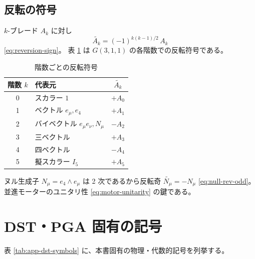 \documentclass[dvipdfmx,a4paper,oneside]{jsbook}
\numberwithin{equation}{chapter}
\begin{document}
\subsection{反転の符号}

\(k\)-ブレード \(A_k\) に対し
\begin{equation}
  \widetilde{A_k} = (-1)^{k(k-1)/2}\, A_k
  \label{eq:app-reversion}
\end{equation}
\eqref{eq:reversion-sign}。
表 \ref{tab:app-reversion} は \(G(3,1,1)\) の各階数での反転符号である。

\begin{table}[htbp]
  \centering
  \caption{階数ごとの反転符号}
  \label{tab:app-reversion}
  \begin{tabular}{@{}clc@{}}
    \toprule
    階数 \(k\) & 代表元 & \(\widetilde{A_k}\) \\
    \midrule
    0 & スカラー \(1\) & \(+A_0\) \\
    1 & ベクトル \(e_\mu, e_4\) & \(+A_1\) \\
    2 & バイベクトル \(e_\mu e_\nu, N_\mu\) & \(-A_2\) \\
    3 & 三ベクトル & \(+A_3\) \\
    4 & 四ベクトル & \(-A_4\) \\
    5 & 擬スカラー \(I_5\) & \(+A_5\) \\
    \bottomrule
  \end{tabular}
\end{table}

ヌル生成子 \(N_\mu = e_4 \wedge e_\mu\) は 2 次であるから反転奇 \(\widetilde{N_\mu} = -N_\mu\) \eqref{eq:null-rev-odd}。並進モーターのユニタリ性 \eqref{eq:motor-unitarity} の鍵である。

\section{DST・PGA 固有の記号}

表 \ref{tab:app-dst-symbols} に、本書固有の物理・代数的記号を列挙する。
\end{document}
